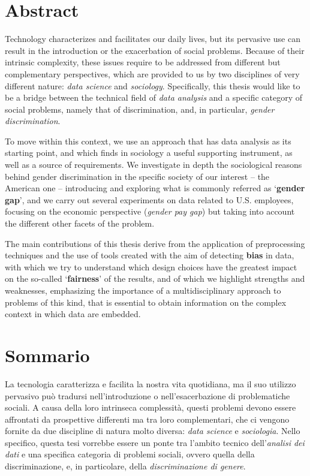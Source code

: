 
\newpage
\chapter*{Abstract}


Technology characterizes and facilitates our daily lives, but its pervasive use can result in the introduction or the exacerbation of social problems. Because of their intrinsic complexity, these issues require to be addressed from different but complementary perspectives, which are provided to us by two disciplines of very different nature: \textit{data science} and \textit{sociology}. Specifically, this thesis would like to be a bridge between the technical field of \textit{data analysis} and a specific category of social problems, namely that of discrimination, and, in particular, \textit{gender discrimination}.

To move within this context, we use an approach that has data analysis as its starting point, and which finds in sociology a useful supporting instrument, as well as a source of requirements. We investigate in depth the sociological reasons behind gender discrimination in the specific society of our interest -- the American one -- introducing and exploring what is commonly referred as `\textbf{gender gap}', and we carry out several experiments on data related to U.S. employees, focusing on the economic perspective (\textit{gender pay gap}) but taking into account the different other facets of the problem.

The main contributions of this thesis derive from the application of preprocessing techniques and the use of tools created with the aim of detecting \textbf{bias} in data, with which we try to understand which design choices have the greatest impact on the so-called `\textbf{fairness}' of the results, and of which we highlight strengths and weaknesses, emphasizing the importance of a multidisciplinary approach to problems of this kind, that is essential to obtain information on the complex context in which data are embedded.


\newpage
\chapter*{Sommario}


La tecnologia caratterizza e facilita la nostra vita quotidiana, ma il suo utilizzo pervasivo pu\`o tradursi nell'introduzione o nell'esacerbazione di problematiche sociali. A causa della loro intrinseca complessit\`a, questi problemi devono essere affrontati da prospettive differenti ma tra loro complementari, che ci vengono fornite da due discipline di natura molto diversa: \textit{data science} e \textit{sociologia}. Nello specifico, questa tesi vorrebbe essere un ponte tra l'ambito tecnico dell'\textit{analisi dei dati} e una specifica categoria di problemi sociali, ovvero quella della discriminazione, e, in particolare, della \textit{discriminazione di genere}.


